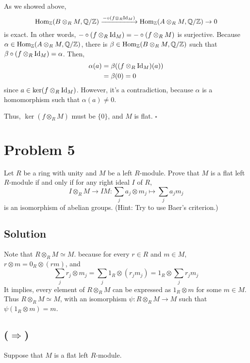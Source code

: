 \documentclass{article}
\newcommand{\qedsq}{\hfill$\square$}
\newcommand{\bbQ}{\mathbb{Q}}
\newcommand{\bbZ}{\mathbb{Z}}
\newcommand{\Hom}{\textnormal{Hom}}
\newcommand{\Id}{\textnormal{Id}}
\begin{document}
As we showed above,
\[
  \Hom_\bbZ(B \otimes_R M, \bbQ/\bbZ)
  \xrightarrow{- \circ (f \otimes_R \Id_M)}
  \Hom_\bbZ(A \otimes_R M, \bbQ/\bbZ)
  \rightarrow
  0
\]
is exact.
In other words, \(- \circ (f \otimes_R \Id_M) = - \circ (f \otimes_R M)\)
is surjective.
Because \(\alpha \in \Hom_\bbZ(A \otimes_R M, \bbQ/\bbZ)\),
there is \(\beta \in \Hom_\bbZ(B \otimes_R M, \bbQ/\bbZ)\)
such that
\(\beta \circ (f \otimes_R \Id_M) = \alpha\).
Then,
\begin{align*}
  \alpha(a)
  &= \beta ((f \otimes_R \Id_M)(a))
  \\&= \beta(0) = 0
\end{align*}
since \(a \in \ker (f \otimes_R \Id_M)\).
However, it's a contradiction, because \(\alpha\) is a homomorphism such that \(\alpha(a) \neq 0\).

Thus, \(\ker (f \otimes_R M)\) must be \(\{0\}\),
and \(M\) is flat.
\qedsq

\newpage
\section*{Problem 5}

Let \(R\) be a ring with unity and \(M\) be a left \(R\)-module.
Prove that \(M\) is a flat left \(R\)-module
if and only if
for any right ideal \(I\) of \(R\),
\[I \otimes_R M \to IM: \sum_{j} a_j \otimes m_j \mapsto \sum_{j} a_j m_j\]
is an isomorphism of abelian groups.
(Hint: Try to use Baer's criterion.)

\subsection*{Solution}

Note that \(R \otimes_R M \simeq M\). because for every \(r \in R\) and \(m \in M\), \(r \otimes m = 0_R \otimes (rm)\),
and
\[\sum_j r_j \otimes m_j = \sum_j 1_R \otimes (r_jm_j) = 1_R \otimes \sum_j r_jm_j\]
It implies, every element of \(R \otimes_R M\) can be expressed as \(1_R \otimes m\) for some \(m \in M\).
Thus \(R \otimes_R M \simeq M\), with an isomorphism \(\psi: R \otimes_R M \to M\) such that \(\psi(1_R \otimes m) = m\).

\subsection*{(\(\Longrightarrow\))}

Suppose that \(M\) is a flat left \(R\)-module.
\end{document}
